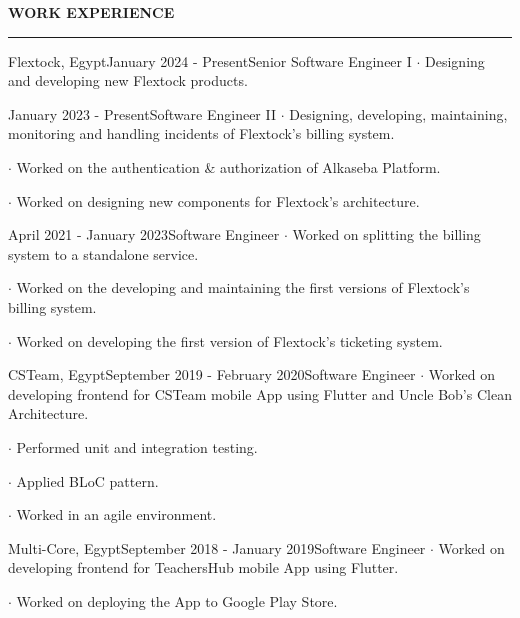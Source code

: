 \noindent\textcolor{themecolor}{\textbf{WORK EXPERIENCE}}

\vspace{2mm}
\hrule
\vspace{3mm}

\begin{verbose}{Flextock, Egypt}{January 2024 - Present}{Senior Software Engineer I}
    \noindent $\cdot$ Designing and developing new Flextock products.
\end{verbose}
\begin{verbose}{}{January 2023 - Present}{Software Engineer II}
    \noindent $\cdot$ Designing, developing, maintaining, monitoring and handling incidents of Flextock's billing system.

    \noindent $\cdot$ Worked on the authentication \& authorization of Alkaseba Platform.

    \noindent $\cdot$ Worked on designing new components for Flextock's architecture.
\end{verbose}
\begin{verbose}{}{April 2021 - January 2023}{Software Engineer}
    \noindent $\cdot$ Worked on splitting the billing system to a standalone service.

    \noindent $\cdot$ Worked on the developing and maintaining the first versions of Flextock's billing system.

    \noindent $\cdot$ Worked on developing the first version of Flextock's ticketing system.
\end{verbose}

\vspace{3mm}

\begin{verbose}{CSTeam, Egypt}{September 2019 - February 2020}{Software Engineer}
    \noindent $\cdot$ Worked on developing frontend for CSTeam mobile App using Flutter and Uncle Bob's Clean Architecture.

    \noindent $\cdot$ Performed unit and integration testing.
    
    \noindent $\cdot$ Applied BLoC pattern.
    
    \noindent $\cdot$ Worked in an agile environment.
\end{verbose}

\vspace{3mm}

\begin{verbose}{Multi-Core, Egypt}{September 2018 - January 2019}{Software Engineer}
    \noindent $\cdot$ Worked on developing frontend for TeachersHub mobile App using Flutter.

    \noindent $\cdot$ Worked on deploying the App to Google Play Store.
\end{verbose}

